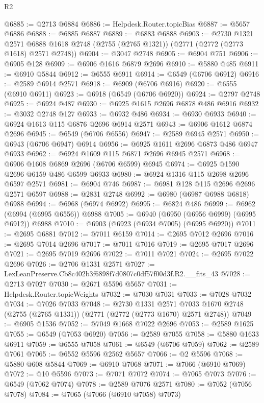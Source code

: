 \begin{lexlean}{R2}
\begin{coremodule}
@6885 := @2713 @6884
@6886 := Helpdesk.Router.topicBias
@6887 := @5657 @6886
@6888 := @6885 @6887
@6889 := @6883 @6888
@6903 := @2730
    @1321
    @2571
    @6888
    @1618
    @2748
    (@2755 (@2765 @1321))
    (@2771 (@2772 (@2773 @1618) @2571 @2748))
@6904 := @3047 @2748
@6905 := @6904 @751
@6906 := @6905 @128
@6909 := @6906 @1616 @6879 @2696
@6910 := @5880 @485
@6911 := @6910 @5844
@6912 := @6555 @6911
@6914 := @6549 (@6706 @6912)
@6916 := @2589 @6914 @2571
@6918 := @6909 (@6706 @6916)
@6920 := @6555 (@6910 @6911)
@6923 := @6918 (@6549 (@6706 @6920))
@6924 := @2797 @2748
@6925 := @6924 @487
@6930 := @6925 @1615 @2696 @6878 @486 @6916
@6932 := @3032 @2748 @127
@6933 := @6932 @486
@6934 := @6930 @6933
@6940 := @6924 @1613 @115 @6876 @2696 @6914 @2571
@6943 := @6906 @1612 @6874 @2696
@6945 := @6549 (@6706 @6556)
@6947 := @2589 @6945 @2571
@6950 := @6943 (@6706 @6947) @6914
@6956 := @6925 @1611 @2696 @6873 @486 @6947 @6933
@6962 := @6924 @1609 @115 @6871 @2696 @6945 @2571
@6968 := @6906 @1608 @6869 @2696 (@6706 @6599) @6945
@6974 := @6925 @1590 @2696 @6159 @486 @6599 @6933
@6980 := @6924 @1316 @115 @2698 @2696 @6597 @2571
@6981 := @6904 @746
@6987 := @6981 @128 @115 @2696 @2696 @2571 @6597
@6988 := @2831 @2748
@6992 := @6980 (@6987 @6988 @6818) @6988
@6994 := @6968 (@6974 @6992)
@6995 := @6824 @486
@6999 := @6962 (@6994 (@6995 @6556)) @6988
@7005 := @6940 (@6950 (@6956 @6999) (@6995 @6912)) @6988
@7010 := @6903 (@6923 (@6934 @7005) (@6995 @6920))
@7011 := @2695 @6881
@7012 := @7011 @6159
@7014 := @2695 @7012 @2696
@7016 := @2695 @7014 @2696
@7017 := @7011 @7016
@7019 := @2695 @7017 @2696
@7021 := @2695 @7019 @2696
@7022 := @7011 @7021
@7024 := @2695 @7022 @2696
@7026 := @2706 @1331 @2571
@7027 := LexLeanPreserve.Cb8c402b3f6898f7d0807c0df57f00d3f.R2.__fits_43
@7028 := @2713 @7027
@7030 := @2671 @5596 @5657
@7031 := Helpdesk.Router.topicWeights
@7032 := @7030 @7031
@7033 := @7028 @7032
@7034 := @7026 @7033
@7048 := @2730
    @1331
    @2571
    @7033
    @1670
    @2748
    (@2755 (@2765 @1331))
    (@2771 (@2772 (@2773 @1670) @2571 @2748))
@7049 := @6905 @1536
@7052 := @7049 @1668 @7022 @2696
@7053 := @2589 @1625
@7055 := @6549 (@7053 @6920)
@7056 := @2589 @7055
@7058 := @5880 @1633 @6911
@7059 := @6555 @7058
@7061 := @6549 (@6706 @7059)
@7062 := @2589 @7061
@7065 := @6552 @5596 @2562 @5657
@7066 := @2 @5596
@7068 := @5880 @608 @5844
@7069 := @6910 @7068
@7071 := @7066 (@6910 @7069)
@7072 := @10 @5596
@7073 := @7071 @7072
@7074 := @7065 @7073
@7076 := @6549 (@7062 @7074)
@7078 := @2589 @7076 @2571
@7080 := @7052 (@7056 @7078)
@7084 := @7065 (@7066 (@6910 @7058) @7073)

\end{coremodule}
\end{lexlean}
